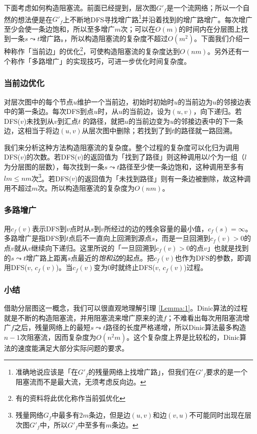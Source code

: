 \documentclass{ctexbook}
\begin{document}
  下面考虑如何构造阻塞流。前面已经提到，层次图$G'_f$是一个流网络；所以一个自然的想法便是在$G'_f$上不断地DFS寻找增广路\footnote{准确地说应该是「在$G'_f$的残量网络上找增广路」，但我们在$G'_f$要求的是一个阻塞流而不是最大流，无须考虑反向边。}并沿着找到的增广路增广。每次增广至少会使一条边饱和，所以至多增广$m$次；可以在$O(m)$的时间内在分层图上找到一条$s\leadsto t$增广路。，所以构造阻塞流的复杂度不超过$O(m^2)$。下面我们介绍一种称作「当前边」的优化\footnote{有的资料将此优化称作当前弧优化}，可使构造阻塞流的复杂度达到$O(nm)$。另外还有一个称作「多路增广」的实现技巧，可进一步优化时间复杂度。
  \subsubsection*{当前边优化}
  对层次图中的每个节点$u$维护一个当前边，初始时初始时$u$的当前边为$u$的邻接边表中的第一条边。每次DFS到点$u$时，从$u$的当前边，设为$(u,v)$，向下递归。若DFS($v$)未找到从$v$到汇点$t$ 的路径，就把$u$的当前边变为$u$的邻接边表中的下一条边，这相当于将边$(u,v)$从层次图中删除；若找到了到$t$的路径就一路回溯。

  我们来分析这种方法构造阻塞流的复杂度。整个过程的复杂度可以化归为调用DFS($v$)的次数。若DFS($v$)的返回值为「找到了路径」则这种调用以$l$个为一组（$l$为分层图的层数），每次找到一条$s\leadsto t$路径至少使一条边饱和，这种调用至多有$lm\le nm$次\footnote{残量网络$G_f$中最多有$2m$条边，但是边$(u,v)$和边$(v,u)$不可能同时出现在层次图$G'_f$中，所以$G'_f$中至多有$m$条边。}。若DFS($v$)的返回值为「未找到路径」则有一条边被删除，故这种调用不超过$m$次。所以构造阻塞流的复杂度为$O(nm)$。
  \subsubsection*{多路增广}
  用$c_f(v)$表示DFS到$v$点时从$s$到$v$所经过的边的残余容量的最小值，$c_f(s) = \infty$。
  多路增广是指DFS到$t$点后不一直向上回溯到源点$s$，而是一旦回溯到$c_f(v)>0$的点$v$就从$v$继续向下递归。这里所说的「一旦回溯到$c_f(v)>0$的点$v$」也就是找到的$s\leadsto t$增广路上距离$s$点最近的\emph{饱和边}的起点。把$c_f(v)$也作为DFS的参数，即调用DFS($v$, $c_f(v)$)。当$c_f(v)$变为$0$时就终止DFS($v$, $c_f(v)$)过程。

  \subsubsection*{小结}
  借助分层图这一概念，我们可以很直观地理解引理 \ref{Lemma:1}。Dinic算法的过程就是不断的构造阻塞流，并用阻塞流来增广原来的流$f$；不难看出每次用阻塞流增广$f$之后，残量网络上的最短$s\leadsto t$路径的长度严格递增，所以Dinic算法最多构造$n-1$次阻塞流，因而复杂度为$O(n^2m)$。这个复杂度上界是比较松的，Dinic算法的速度能满足大部分实际问题的要求。
\end{document}
